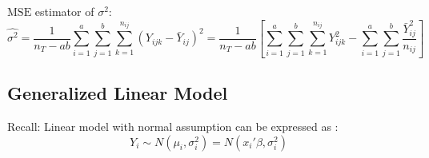     $ \mathrm{MSE}  $ estimator of $ \sigma ^2 $:
    \begin{equation}
        \hat{\sigma ^2}= \dfrac{1}{n_T-ab}\sum_{i=1}^a\sum_{j=1}^b\sum_{k=1}^{n_{ij}}(Y_{ijk}-\bar{Y}_{ij})^2=\dfrac{1}{n_T-ab}\left[ \sum_{i=1}^a\sum_{j=1}^b\sum_{k=1}^{n_{ij}}Y_{ijk}^2-\sum_{i=1}^a\sum_{j=1}^b\dfrac{\bar{Y}_{ij}^2}{n_{ij}} \right]
    \end{equation}
    

    
    

        

    


\subsection{Generalized Linear Model}\label{SubSectionGeneralizedLinearModel}
    Recall: Linear model with normal assumption can be expressed as :
    \begin{equation}
        Y_i\sim N(\mu _i,\sigma_i ^2)=N(x_i'\beta ,\sigma_i ^2) 
    \end{equation}
    
